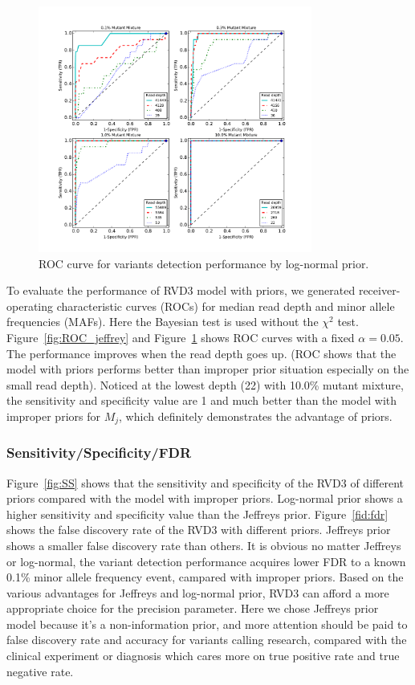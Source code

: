\documentclass[11pt,reqno]{amsart}
\begin{document}
\begin{figure}[htbp]
\begin{center}
\includegraphics[width=90mm]{figs/ROC_without_chi2_lognormal.pdf}
\caption{ROC curve for variants detection performance by log-normal prior.}
\label{fig:ROC_lognormal}
\end{center}
\end{figure}


To evaluate the performance of RVD3 model with priors, we generated receiver-operating characteristic curves (ROCs) for median read depth and minor allele frequencies (MAFs).
Here the Bayesian test is used without the $\chi^2$ test. Figure~\ref{fig:ROC_jeffrey} and Figure~\ref{fig:ROC_lognormal} shows ROC curves with a fixed $\alpha=0.05$.
The performance improves when the read depth goes up. (ROC shows that the model with priors performs better than improper prior situation especially on the small read depth).
Noticed at the lowest depth (22) with 10.0\% mutant mixture, the sensitivity and specificity value are 1 and much better than the model with improper priors for $M_j$, which definitely demonstrates the advantage of priors.

\subsubsection{Sensitivity/Specificity/FDR}

Figure~\ref{fig:SS} shows that the sensitivity and specificity of the RVD3 of different priors compared with the model with improper priors.
Log-normal prior shows a higher sensitivity and specificity value than the Jeffreys prior.
Figure~\ref{fid:fdr} shows the false discovery rate of the RVD3 with different priors. Jeffreys prior shows a smaller false discovery rate than others.
It is obvious no matter Jeffreys or log-normal, the variant detection performance acquires lower FDR to a known 0.1\% minor allele frequency event, campared with improper priors.
Based on the various advantages for Jeffreys and log-normal prior, RVD3 can afford a more appropriate choice for the precision parameter.
Here we chose Jeffreys prior model because it's a non-information prior, and more attention should be paid to false discovery rate and accuracy for variants calling research, compared with the clinical experiment or diagnosis which cares more on true positive rate and true negative rate.
\end{document}
